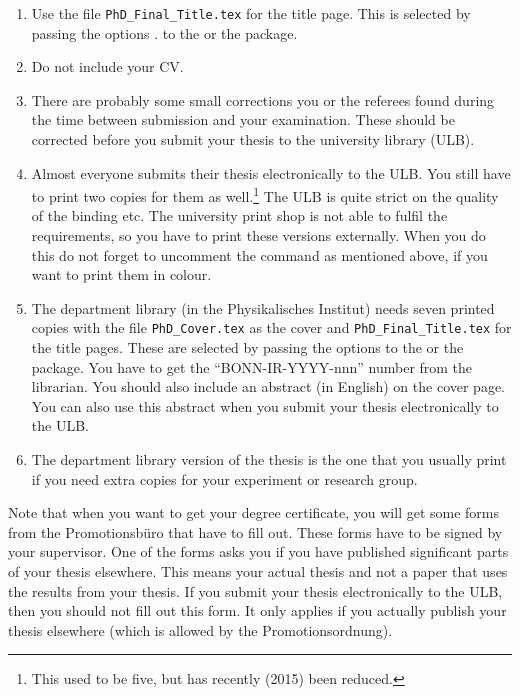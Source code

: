 \begin{enumerate}
\item Use the file \texttt{PhD\_Final\_Title.tex} for the title page.
  This is selected by passing the options .
  to the  or the  package.
\item Do not include your CV\@.
\item There are probably some small corrections you or the referees
  found during the time between submission and your examination. These
  should be corrected before you submit your thesis to the university
  library (ULB).
\item Almost everyone submits their thesis electronically to the ULB\@.
  You still have to print two copies for them as well.\footnote{%
  This used to be five, but has recently (2015) been reduced.}
  The ULB is quite strict on the quality of the binding etc. The university
  print shop is not able to fulfil the requirements, so you have to print
  these versions externally. When you do this do not forget to
  uncomment the  command as mentioned above, if you
  want to print them in colour.
\item The department
  library (in the Physikalisches
  Institut) needs seven printed copies with the file
  \texttt{PhD\_Cover.tex} as the cover and
  \texttt{PhD\_Final\_Title.tex} for the title pages.
  These are selected by passing the options 
  to the  or the  package.
  You have to get
  the \enquote{BONN-IR-YYYY-nnn} number from the librarian. You
  should also include an abstract (in English) on the cover page. You
  can also use this abstract when you submit your thesis
  electronically to the ULB\@.
\item The department library version of the thesis is the one that you usually print if
  you need extra copies for your experiment or research group.
\end{enumerate}

Note that when you want to get your degree certificate, you will get
some forms from the \foreignlanguage{ngerman}{Promotionsbüro} that have
to fill out. These forms have to be signed by your supervisor. One of
the forms asks you if you have published significant parts of your
thesis elsewhere. This means your actual thesis and not a paper that
uses the results from your thesis. If you submit your thesis
electronically to the ULB, then you should not fill out this form. It
only applies if you actually publish your thesis elsewhere (which is
allowed by the \foreignlanguage{ngerman}{Promotionsordnung}).
